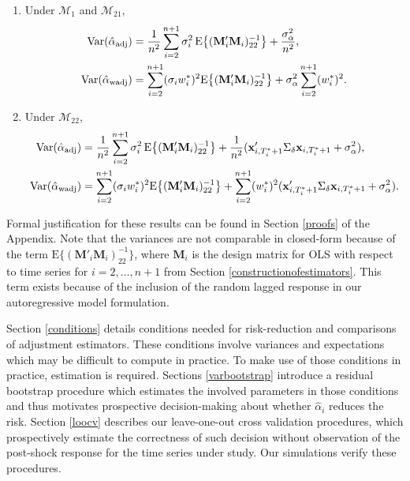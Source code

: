 \documentclass[11pt,3p,review,authoryear]{elsarticle}
\def\mbf#1{\mathbf{#1}} %
\def\mrm#1{\mathrm{#1}} %
\def\mc#1{\mathcal{#1}} %
\def\var#1{\mathrm{Var}(#1)} %
\theoremstyle{definition}
\begin{document}
\begin{enumerate}[label = (\roman*)]
  \item Under $\mc{M}_1$ and $\mc{M}_{21}$,  
\begin{align*}
  \var{\hat{\alpha}_{\rm adj}} 
  &=\frac{1}{n^2}\sum_{i=2}^{n+1}\sigma^2_i\, \mrm{E}\big\{(\mbf{M}'_i\mbf{M}_i)^{-1}_{22}\big\}+\frac{\sigma^2_{\alpha}}{n^2}, \\
\var{\hat{\alpha}_{\rm wadj}}  &= \sum_{i=2}^{n+1}(\sigma_iw_i^*)^2\mrm{E}\big\{(\mbf{M}'_i\mbf{M}_i)^{-1}_{22}\big\}+\sigma^2_{\alpha}\sum_{i=2}^{n+1}(w_i^*)^2.
\end{align*}
\item Under $\mc{M}_{22}$, 
\begin{align*}
\var{\hat{\alpha}_{\rm adj}} 
  &=\frac{1}{n^2}\sum_{i=2}^{n+1}\sigma_i^2\, \mrm{E}\big\{(\mbf{M}'_i\mbf{M}_i)^{-1}_{22}\big\} +\frac{1}{n^2}(\mbf{x}_{i, T_i^*+1}'\Sigma_{\delta}\mbf{x}_{i, T_i^*+1} + \sigma^2_{\alpha}),\\
  \var{\hat{\alpha}_{\rm wadj}} 
  &=\sum_{i=2}^{n+1}(\sigma_iw_i^*)^2\mrm{E}\big\{(\mbf{M}'_i\mbf{M}_i)^{-1}_{22}\big\} + \sum_{i=2}^{n+1} (w_i^*)^2 (\mbf{x}_{i, T_i^*+1}'\Sigma_{\delta}\mbf{x}_{i, T_i^*+1} + \sigma^2_{\alpha}).
\end{align*}
\end{enumerate}
Formal justification for these results can be found in Section \ref{proofs} of the Appendix. Note that the variances are not comparable in closed-form because of the term $\mrm{E}\big\{(\mbf{M}'_i\mbf{M}_i)^{-1}_{22}\big\}$, where  $\mbf{M}_i$ is the design matrix for OLS with respect to time series for $i = 2, \ldots, n+1$ from Section \ref{constructionofestimators}.  This term exists because of the inclusion of the random lagged response in our autoregressive model formulation.   



Section \ref{conditions} details conditions needed for risk-reduction and comparisons of adjustment estimators. These conditions involve variances and expectations which may be difficult to compute in practice. To make use of those conditions in practice, estimation is required. Sections \ref{varbootstrap} introduce a residual bootstrap procedure which estimates the involved parameters in those conditions and thus motivates prospective decision-making about whether $\hat{\alpha}_i$ reduces the risk. Section \ref{loocv} describes our leave-one-out cross validation procedures, which prospectively estimate the correctness of such decision without observation of the post-shock response for the time series under study. Our simulations verify these procedures. 
\end{document}
